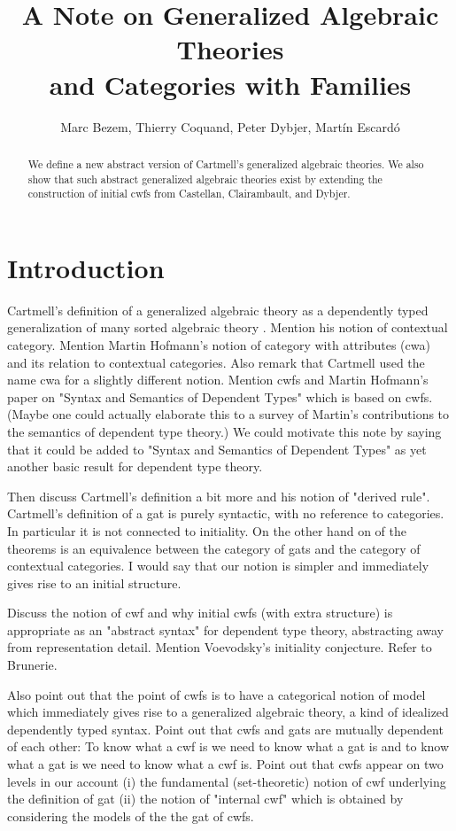 \documentclass{lmcs}
\title[Generalized Algebraic Theories and Categories with Families]{A Note on Generalized Algebraic Theories\\and Categories with Families}\author{Marc Bezem, Thierry Coquand, Peter Dybjer, Mart\'in Escard\'o}
\begin{document}
\maketitle

\begin{abstract}
We define a new abstract version of Cartmell's generalized algebraic theories. We also show that such abstract generalized algebraic theories exist by extending the construction of initial cwfs from Castellan, Clairambault, and Dybjer.
\end{abstract}

\section{Introduction}

Cartmell's definition of a generalized algebraic theory as a dependently typed generalization of many sorted algebraic theory \cite{cartmell:phd,cartmell:}. Mention his notion of contextual category. Mention Martin Hofmann's notion of category with attributes (cwa) and its relation to contextual categories. Also remark that Cartmell used the name cwa for a slightly different notion. Mention cwfs and Martin Hofmann's paper on "Syntax and Semantics of Dependent Types" which is based on cwfs. (Maybe one could actually elaborate this to a survey of Martin's contributions to the semantics of dependent type theory.) We could motivate this note by saying that it could be added to "Syntax and Semantics of Dependent Types" as yet another basic result for dependent type theory.

Then discuss Cartmell's definition a bit more and his notion of "derived rule". Cartmell's definition of a gat is purely syntactic, with no reference to categories. In particular it is not connected to initiality. On the other hand on of the theorems is an equivalence between the category of gats and the category of contextual categories. I would say that our notion is simpler and immediately gives rise to an initial structure.

Discuss the notion of cwf and why initial cwfs (with extra structure) is appropriate as an "abstract syntax" for dependent type theory, abstracting away from representation detail. Mention Voevodsky's initiality conjecture. Refer to Brunerie.

Also point out that the point of cwfs is to have a categorical notion of model which immediately gives rise to a generalized algebraic theory, a kind of idealized dependently typed syntax. Point out that cwfs and gats are mutually dependent of each other: To know what a cwf is we need to know what a gat is and to know what a gat is we need to know what a cwf is. Point out that cwfs appear on two levels in our account (i) the fundamental (set-theoretic) notion of cwf underlying the definition of gat (ii) the notion of "internal cwf" which is obtained by considering the models of the the gat of cwfs.
\end{document}
